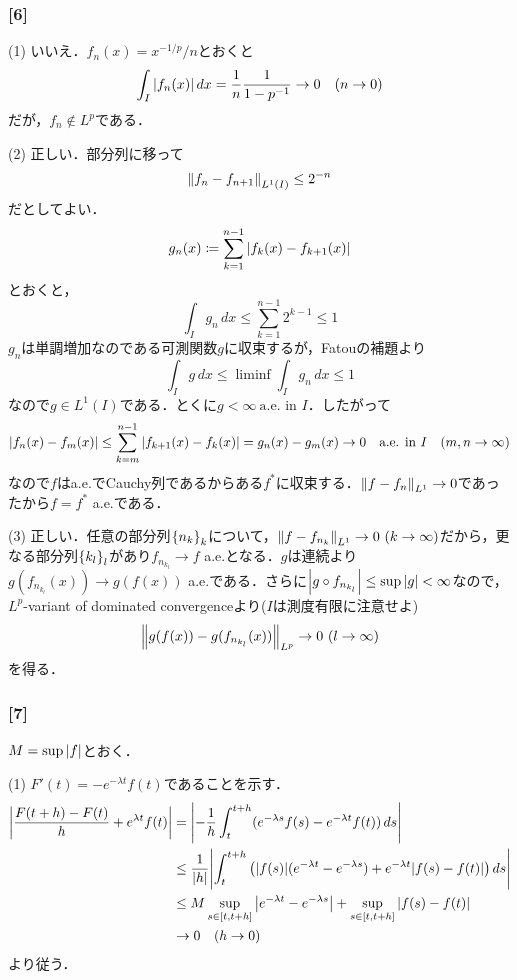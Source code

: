 \documentclass[a4j]{ltjsarticle}
\newcommand{\1}{\mathbbm{1}}
\numberwithin{equation}{section}
\theoremstyle{definition}
\begin{document}
\subsubsection*{[6]}
(1) いいえ．$f_n(x)=x^{-1/p}/n$とおくと
\begin{equation}
    \int_{I}\abs{f_n(x)}\,dx=\frac{1}{n}\frac{1}{1-p^{-1}}\to 0\quad (n\to0) 
\end{equation}
だが，$f_n\notin L^p$である．

(2) 正しい．部分列に移って
\begin{equation}
    \norm{f_n-f_{n+1}}_{L^1(I)}\leq 2^{-n}
\end{equation}
だとしてよい．
\begin{equation}
    g_n(x)\coloneq\sum_{k=1}^{n-1}\abs{f_k(x)-f_{k+1}(x)}
\end{equation}
とおくと，
\begin{equation}
    \int_{I}g_n\,dx\leq \sum_{k=1}^{n-1}2^{k-1}\leq 1 
\end{equation}
$g_n$は単調増加なのである可測関数$g$に収束するが，Fatouの補題より
\begin{equation}
    \int_{I}g\,dx\leq \liminf\int_{I}g_n\,dx\leq 1 
\end{equation}
なので$g\in L^1(I)$である．とくに$g<\infty\ \text{a.e. in $I$}$．したがって
\begin{equation}
    \abs{f_n(x)-f_m(x)}\leq \sum_{k=m}^{n-1}\abs{f_{k+1}(x)-f_k(x)}=g_n(x)-g_m(x)\to 0 \quad \text{a.e. in $I$}\quad(m,n\to\infty)
\end{equation}
なので$f$はa.e.でCauchy列であるからある$f^\ast$に収束する．$\norm{f-f_n}_{L^1}\to0$であったから$f=f^\ast$ a.e.である．

(3) 正しい．任意の部分列$\qty{n_k}_k$について，$\norm{f-f_{n_k}}_{L^1}\to0\ (k\to\infty)$だから，更なる部分列$\qty{k_l}_l$があり$f_{n_{k_l}}\to f$ a.e.となる．$g$は連続より$g(f_{n_{k_l}}(x))\to g(f(x))$ a.e.である．さらに$\abs{g\circ f_{n_{k_l}}}\leq \sup\abs{g}<\infty$なので，$L^p$-variant of dominated convergenceより($I$は測度有限に注意せよ)
\begin{equation}
    \norm{g(f(x))-g(f_{n_{k_{l}}}(x))}_{L^p}\to0\ (l\to\infty)    
\end{equation}
を得る．
\subsubsection*{[7]}
$M=\sup\abs{f}$とおく．

(1) $F'(t)=-e^{-\lambda t}f(t)$であることを示す．
\begin{align}
    \abs{\frac{F(t+h)-F(t)}{h}+e^{\lambda t}f(t)}
    &=\abs{-\frac{1}{h}\int_{t}^{t+h}(e^{-\lambda s}f(s)-e^{-\lambda t}f(t))\,ds}\\
    &\leq \frac{1}{\abs{h}}\abs{\int_{t}^{t+h}\qty(\abs{f(s)}(e^{-\lambda t}-e^{-\lambda s})+e^{-\lambda t}\abs{f(s)-f(t)})\,ds}\\
    &\leq M\sup_{s\in[t,t+h]}\abs{e^{-\lambda t}-e^{-\lambda s}}+\sup_{s\in[t,t+h]}\abs{f(s)-f(t)}\\
    &\to0\quad (h\to0)
\end{align}
より従う．
\end{document}
